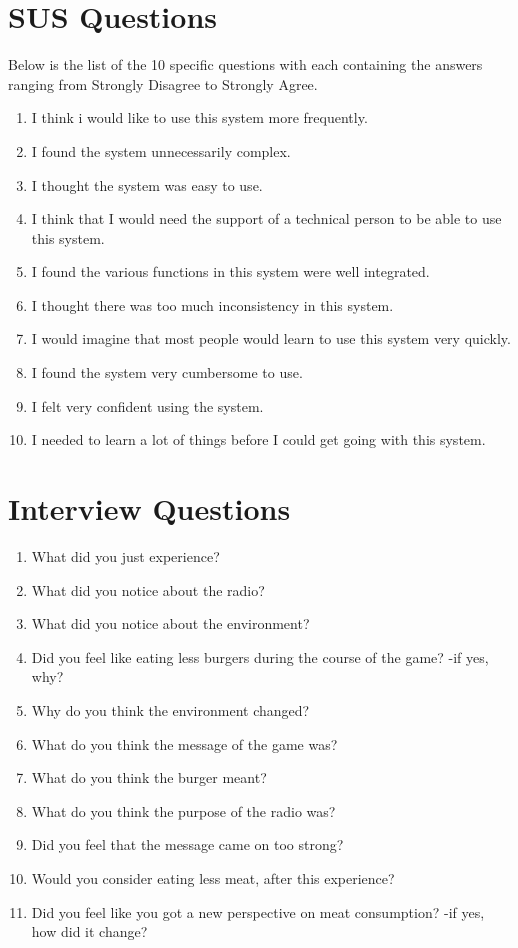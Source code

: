 \renewcommand{\thesection}{\Alph{section}}

\section{SUS Questions}\label{SUS}
Below is the list of the 10 specific questions with each containing the answers ranging from Strongly Disagree to Strongly Agree. 

\begin{enumerate}
    \item I think i would like to use this system more frequently.
    \item I found the system unnecessarily complex.
    \item I thought the system was easy to use.
    \item I think that I would need the support of a technical person to be able to use this system.
    \item I found the various functions in this system were well integrated.
    \item I thought there was too much inconsistency in this system.
    \item I would imagine that most people would learn to use this system very quickly.
    \item I found the system very cumbersome to use.
    \item I felt very confident using the system.
    \item I needed to learn a lot of things before I could get going with this system.\\
\end{enumerate}

\section{Interview Questions}
\begin{enumerate}\label{FinalTestQuestions}
    \item What did you just experience?
    \item What did you notice about the radio?
    \item What did you notice about the environment?
    \item Did you feel like eating less burgers during the course of the game? -if yes, why?
    \item Why do you think the environment changed?
    \item What do you think the message of the game was?
    \item What do you think the burger meant?
    \item What do you think the purpose of the radio was?
    \item Did you feel that the message came on too strong?
    \item Would you consider eating less meat, after this experience?
    \item Did you feel like you got a new perspective on meat consumption? -if yes, how did it change?
\end{enumerate}